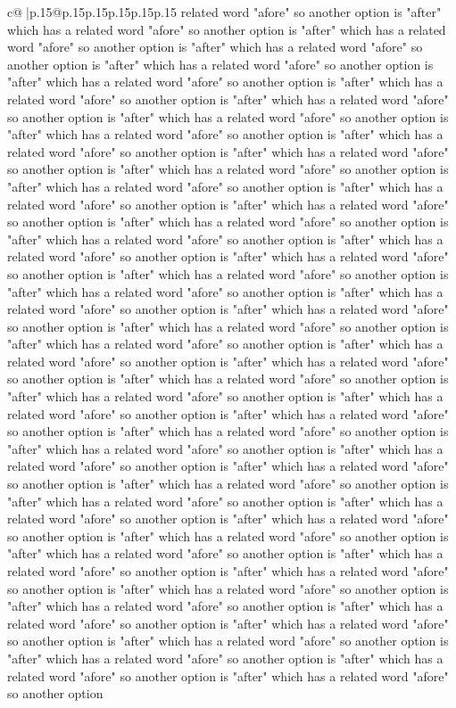 \documentclass{article}
\begin{document}
{\begin{supertabular}{c@{$\;$}|p{.15\linewidth}@{}p{.15\linewidth}p{.15\linewidth}p{.15\linewidth}p{.15\linewidth}p{.15\linewidth}}
{{{related word "afore" so another option is "after" which has a related word "afore" so another option is "after" which has a related word "afore" so another option is "after" which has a related word "afore" so another option is "after" which has a related word "afore" so another option is "after" which has a related word "afore" so another option is "after" which has a related word "afore" so another option is "after" which has a related word "afore" so another option is "after" which has a related word "afore" so another option is "after" which has a related word "afore" so another option is "after" which has a related word "afore" so another option is "after" which has a related word "afore" so another option is "after" which has a related word "afore" so another option is "after" which has a related word "afore" so another option is "after" which has a related word "afore" so another option is "after" which has a related word "afore" so another option is "after" which has a related word "afore" so another option is "after" which has a related word "afore" so another option is "after" which has a related word "afore" so another option is "after" which has a related word "afore" so another option is "after" which has a related word "afore" so another option is "after" which has a related word "afore" so another option is "after" which has a related word "afore" so another option is "after" which has a related word "afore" so another option is "after" which has a related word "afore" so another option is "after" which has a related word "afore" so another option is "after" which has a related word "afore" so another option is "after" which has a related word "afore" so another option is "after" which has a related word "afore" so another option is "after" which has a related word "afore" so another option is "after" which has a related word "afore" so another option is "after" which has a related word "afore" so another option is "after" which has a related word "afore" so another option is "after" which has a related word "afore" so another option is "after" which has a related word "afore" so another option is "after" which has a related word "afore" so another option is "after" which has a related word "afore" so another option is "after" which has a related word "afore" so another option is "after" which has a related word "afore" so another option is "after" which has a related word "afore" so another option is "after" which has a related word "afore" so another option is "after" which has a related word "afore" so another option is "after" which has a related word "afore" so another option is "after" which has a related word "afore" so another option is "after" which has a related word "afore" so another option is "after" which has a related word "afore" so another option is "after" which has a related word "afore" so another option is "after" which has a related word "afore" so another option is "after" which has a related word "afore" so another option is "after" which has a related word "afore" so another option is "after" which has a related word "afore" so another option is "after" which has a related word "afore" so another option }}}
\end{supertabular}}
\end{document}

